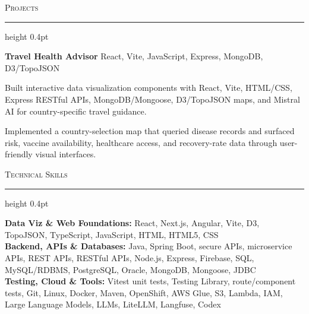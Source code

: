 \documentclass[letterpaper,11pt]{article}
\newcommand{\resumesection}[1]{%
  \par\vspace{2pt}%
  {\large\scshape #1}\par\vspace{2pt}%
  \hrule height 0.4pt\vspace{2pt}%
}
\newcommand{\projectHeading}[2]{
  \textbf{#1} \hfill #2
}
\begin{document}
\resumesection{Projects}
\projectHeading{Travel Health Advisor}{React, Vite, JavaScript, Express, MongoDB, D3/TopoJSON}
\begin{tightitemize}
  \item Built interactive data visualization components with React, Vite, HTML/CSS, Express RESTful APIs, MongoDB/Mongoose, D3/TopoJSON maps, and Mistral AI for country-specific travel guidance.
  \item Implemented a country-selection map that queried disease records and surfaced risk, vaccine availability, healthcare access, and recovery-rate data through user-friendly visual interfaces.
\end{tightitemize}

\resumesection{Technical Skills}
\textbf{Data Viz \& Web Foundations:} React, Next.js, Angular, Vite, D3, TopoJSON, TypeScript, JavaScript, HTML, HTML5, CSS\\
\textbf{Backend, APIs \& Databases:} Java, Spring Boot, secure APIs, microservice APIs, REST APIs, RESTful APIs, Node.js, Express, Firebase, SQL, MySQL/RDBMS, PostgreSQL, Oracle, MongoDB, Mongoose, JDBC\\
\textbf{Testing, Cloud \& Tools:} Vitest unit tests, Testing Library, route/component tests, Git, Linux, Docker, Maven, OpenShift, AWS Glue, S3, Lambda, IAM, Large Language Models, LLMs, LiteLLM, Langfuse, Codex
\end{document}

